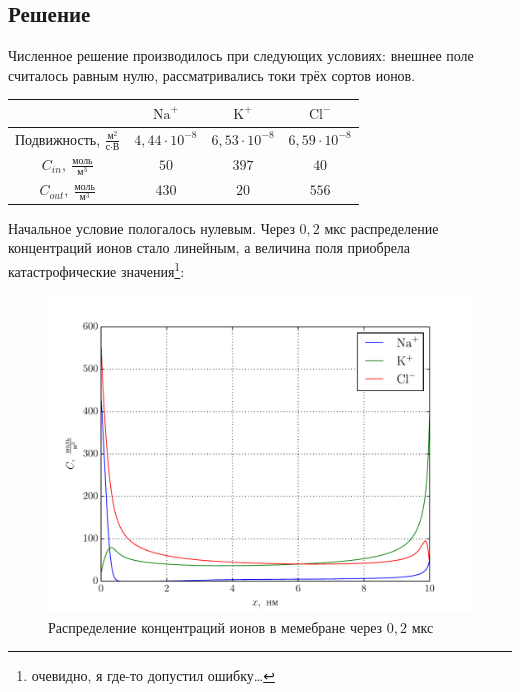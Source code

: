 \subsection{Решение}
Численное решение производилось при следующих условиях: внешнее поле считалось
равным нулю, рассматривались токи трёх сортов ионов.
\begin{table}[h]
    \center
    \begin{tabular}{|c|c|c|c|}\hline
        & \( \mathrm{Na}^+ \) & \( \mathrm{K}^+ \) & \( \mathrm{Cl}^- \) \\
        \hline
        Подвижность, \( \frac{\text{м}^2}{\text{с}\cdot\text{В}} \)
        & \( 4,\!44\cdot10^{-8} \) & \( 6,\!53\cdot10^{-8} \)
        & \( 6,\!59\cdot10^{-8} \) \\ \hline
        \( C_{in},\ \frac{\text{моль}}{\text{м}^3} \)
        & \( 50 \) & \( 397 \) & \( 40 \) \\ \hline
        \( C_{out},\ \frac{\text{моль}}{\text{м}^3} \)
        & \( 430 \) & \( 20 \) & \( 556 \) \\ \hline
    \end{tabular}
\end{table}
Начальное условие пологалось нулевым. Через \( 0,\!2 \) мкс
распределение концентраций ионов стало линейным, а величина поля
приобрела катастрофические значения\footnote{очевидно, я где-то допустил
ошибку\ldots}:
\begin{figure}[h]
\begin{center}
    \includegraphics[width=\textwidth]{plots/stat_conc}
\end{center}
\caption{Распределение концентраций ионов в мемебране через \( 0,\!2 \) мкс}
\end{figure}

